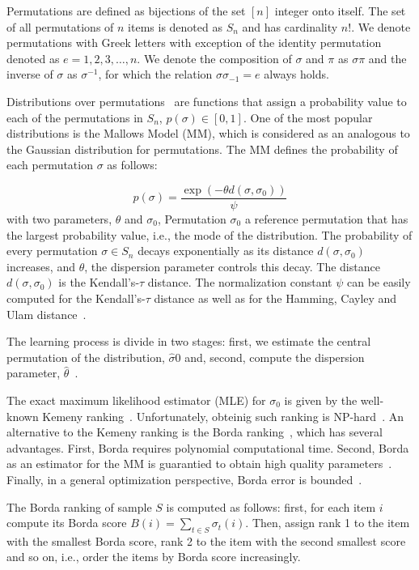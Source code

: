 \documentclass[runningheads]{llncs}
\begin{document}
Permutations are defined as bijections of the set $[n]$ integer onto itself. The set of all permutations of $n$ items is denoted as $S_n$ and has cardinality $n!$. We denote permutations with Greek letters with exception of the identity permutation denoted as $e=1, 2, 3, \ldots,n$. We denote the composition of $\sigma$ and $\pi$ as $\sigma\pi$ and the inverse of $\sigma$ as $\sigma^{-1}$, for which the relation $\sigma\sigma_{-1}=e$ always holds. 

Distributions over permutations~\cite{critchlow91} are functions that assign a probability value to each of the permutations in $S_n$, $p(\sigma)\in[0,1]$. One of the most popular distributions is the Mallows Model (MM), which is considered as an analogous to the Gaussian distribution for permutations. The MM defines the probability of each permutation $\sigma$ as follows:

\begin{equation}
p(\sigma)=\frac{\exp(-\theta d(\sigma, \sigma_0))}{\psi}
\end{equation}
with two parameters, $\theta$ and $\sigma_0$, Permutation $\sigma_0$ a reference permutation that has the largest probability value, i.e., the mode of the distribution. The probability of every permutation $\sigma\in S_n$ decays exponentially as its distance $d(\sigma,\sigma_0)$ increases, and $\theta$, the dispersion parameter controls this decay. The distance $d(\sigma,\sigma_0)$ is the Kendall's-$\tau$ distance. The normalization constant $\psi$ can be easily computed for the Kendall's-$\tau$ distance as well as for the Hamming, Cayley and Ulam distance~\cite{Irurozki2016b}. 

The learning process is divide in two stages: first, we estimate the central permutation of the distribution, $\hat\sigma0$ and, second, compute the dispersion parameter, $\hat\theta$~\cite{Irurozki2016b}. 

The exact maximum likelihood estimator (MLE) for $\sigma_0$ is given by the well-known Kemeny ranking~\cite{Dwork:2001:RAM:371920.372165}. Unfortunately,  obteinig such ranking is NP-hard~\cite{Dwork:2001:RAM:371920.372165}. An alternative to the Kemeny ranking is the Borda ranking~\cite{Ali2011}, which has several advantages. First, Borda requires polynomial computational time. Second, Borda as an estimator for the MM is guarantied to obtain high quality parameters~\cite{Caragiannis2013}. Finally, in a general optimization perspective, Borda error is bounded~\cite{Coppersmith:2010}.

The Borda ranking of sample $S$ is computed as follows: first, for each item $i$ compute its Borda score $B(i) =  \sum_{t\in S}  \sigma_t(i)$. Then, assign rank 1 to the item with the smallest Borda score, rank 2 to the item with the second smallest score and so on, i.e., order the items by Borda score increasingly. 
\end{document}
